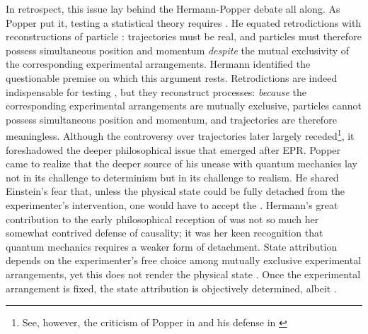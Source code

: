 In retrospect, this issue lay behind the Hermann-Popper debate all along. As Popper put it, testing a statistical theory requires . He equated retrodictions with reconstructions of particle : trajectories must be real, and particles must therefore possess simultaneous position and momentum \emph{despite} the mutual exclusivity of the corresponding experimental arrangements. Hermann identified the questionable premise on which this argument rests. Retrodictions are indeed indispensable for testing \qm, but they reconstruct  processes: \emph{because} the corresponding experimental arrangements are mutually exclusive, particles cannot possess simultaneous position and momentum, and trajectories are therefore meaningless. Although the controversy over trajectories later largely receded\footnote{See, however, the criticism of Popper in \cite{Feyerabend1968,Feyerabend1969} and his defense in \cite[366--67]{Ballentine1970}}, it foreshadowed the deeper philosophical issue that emerged after EPR. Popper came to realize that the deeper source of his unease with quantum mechanics lay not in its challenge to determinism but in its challenge to realism. He shared Einstein's fear that, unless the physical state could be fully detached from the experimenter's intervention, one would have to accept the  \citep[2, 5]{Popper1982}. Hermann's great contribution to the early philosophical reception of \qm was not so much her somewhat contrived defense of causality; it was her keen recognition that quantum mechanics requires a weaker form of detachment. State attribution depends on the experimenter's free choice among mutually exclusive experimental arrangements, yet this does not render the physical state . Once the experimental arrangement is fixed, the state attribution is objectively determined, albeit  \citep[380--81]{Henry-Hermann1948}.

\nocite{Popper2006}



